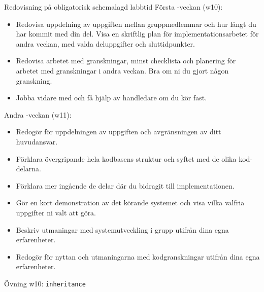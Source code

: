 

\begin{Slide}{Redovisning på obligatorisk schemalagd labbtid}
Första -veckan (w10):
\begin{itemize}\SlideFontTiny
\item Redovisa uppdelning av uppgiften mellan gruppmedlemmar och hur långt du har kommit med din del. Visa en skriftlig plan för implementationsarbetet för andra veckan, med valda deluppgifter och sluttidpunkter.
\item Redovisa arbetet med granskningar, minst checklista och planering för arbetet med granskningar i andra veckan. Bra om ni du gjort någon granskning.
\item Jobba vidare med  och få hjälp av handledare om du kör fast. 
\end{itemize}
Andra -veckan (w11):
\begin{itemize}\SlideFontTiny
\item Redogör för uppdelningen av uppgiften och avgränsningen av ditt huvudansvar.
\item Förklara övergripande hela kodbasens struktur och syftet med de olika kod-delarna.
\item Förklara mer ingående de delar där du bidragit till implementationen.
\item Gör en kort demonstration av det körande systemet och visa vilka valfria uppgifter ni valt att göra.
\item Beskriv utmaningar med systemutveckling i grupp utifrån dina egna erfarenheter.
\item Redogör för nyttan och utmaningarna med kodgranskningar utifrån dina egna erfarenheter.  
\end{itemize}
\end{Slide}

\begin{Slide}{Övning w10: \texttt{inheritance}}
\begin{itemize}\SlideFontTiny

\end{itemize}
\end{Slide}

